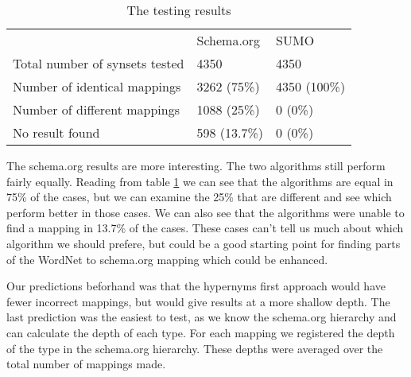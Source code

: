 \begin{table}[ht] %
	\centering
	\begin{tabular}{lll}
										& Schema.org	& SUMO			\\
		Total number of synsets tested 	& 4350			& 4350			\\
		Number of identical mappings 	& 3262 (75\%)	& 4350 (100\%)	\\
		Number  of different mappings	& 1088 (25\%)	& 0	(0\%)		\\
		No result found					& 598  (13.7\%)	& 0	(0\%)
	\end{tabular}
	\caption{The testing results}
	\label{table:AlgorithmResults}
\end{table}

The schema.org results are more interesting.
The two algorithms still perform fairly equally.
Reading from table \ref{table:AlgorithmResults} we can see that the algorithms are equal in 75\% of the cases,
but we can examine the 25\% that are different and see which perform better in those cases.
We can also see that the algorithms were unable to find a mapping in 13.7\% of the cases.
These cases can't tell us much about which algorithm we should prefere,
but could be a good starting point for finding parts of the WordNet to schema.org mapping which could be enhanced.

Our predictions beforhand was that the hypernyms first approach would have fewer incorrect mappings,
but would give results at a more shallow depth.
The last prediction was the easiest to test, as we know the schema.org hierarchy and can calculate the depth of each type.
For each mapping we registered the depth of the type in the schema.org hierarchy.
These depths were averaged over the total number of mappings made.

